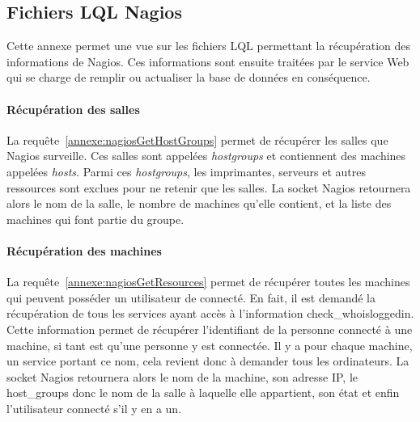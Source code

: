 \begin{appendices}

\chapter{Fichiers LQL Nagios}
\label{annexe:fichiersLQLNagios}

Cette annexe permet une vue sur les fichiers LQL permettant la r\'ecup\'eration des informations de Nagios. 
Ces informations sont ensuite trait\'ees par le service Web qui se charge de remplir ou actualiser la base de donn\'ees en cons\'equence.

\subsubsection{R\'ecup\'eration des salles}

La requ\^ete~\ref{annexe:nagiosGetHostGroups} permet de r\'ecup\'erer les salles que Nagios surveille.
Ces salles sont appel\'ees \textit{hostgroups} et contiennent des machines appel\'ees \textit{hosts}.
Parmi ces \textit{hostgroups}, les imprimantes, serveurs et autres ressources sont exclues pour ne retenir que les salles.
La socket Nagios retournera alors le nom de la salle, le nombre de machines qu'elle contient, et la liste des machines qui font partie du groupe.

\vspace{0.20cm}


\label{annexe:nagiosGetHostGroups}

\subsubsection{R\'ecup\'eration des machines}

La requ\^ete~\ref{annexe:nagiosGetResources} permet de r\'ecup\'erer toutes les machines qui peuvent poss\'eder un utilisateur de connect\'e.
En fait, il est demand\'e la r\'ecup\'eration de tous les services ayant acc\`es \`a l'information \textsf{check\_whoisloggedin}.
Cette information permet de r\'ecup\'erer l'identifiant de la personne connect\'e \`a une machine, si tant est qu'une personne y est connect\'ee.
Il y a pour chaque machine, un service portant ce nom, cela revient donc \`a demander tous les ordinateurs.
La socket Nagios retournera alors le nom de la machine, son adresse IP, le \textsf{host\_groups} donc le nom de la salle \`a laquelle elle appartient, son \'etat et enfin l'utilisateur connect\'e s'il y en a un.


\end{appendices}
